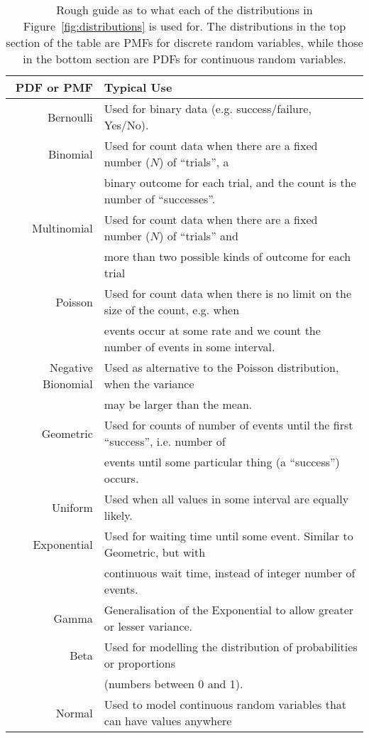 \begin{table}[ht]
\caption{Rough guide as to what each of the distributions in Figure~\ref{fig:distributions} is used for. The distributions in the top section of the table are PMFs for discrete random variables, while those in the bottom section are PDFs for continuous random variables.
\label{tab:distributions}}
\begin{center}
\begin{tabular}{rl}
\hline
PDF or PMF & Typical Use\\
\hline
Bernoulli & Used for binary data (e.g. success/failure, Yes/No).
\\
Binomial & Used for count data when there are a fixed number ($N$) of ``trials'', a \\
         & binary outcome for each trial, and the count is the number of ``successes''.
\\
Multinomial & Used for count data when there are a fixed number ($N$) of ``trials'' and \\
            & more than two possible kinds of outcome for each trial\\
Poisson & Used for count data when there is no limit on the size of the count, e.g. when \\
        & events occur at some  rate and we count the number of events in some interval.
\\
Negative Bionomial & Used as alternative to the Poisson distribution, when the variance \\
        & may be larger than the mean. 
\\
Geometric & Used for counts of number of events until the first ``success'', i.e. number of \\
          & events until some particular thing (a ``success'') occurs.
\\
\hline
Uniform & Used when all values in some interval are equally likely. \\
Exponential & Used for waiting time until some event. Similar to Geometric, but with \\
            & continuous wait time, instead of integer number of events. 
\\
Gamma & Generalisation of the Exponential to allow greater or lesser variance.
\\
Beta & Used for modelling the distribution of probabilities or proportions \\
     & (numbers between 0 and 1). \\
Normal & Used to model continuous random variables that can have values anywhere \\

\end{tabular}
\end{center}
\end{table}
